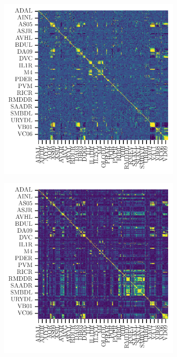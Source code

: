 \begin{figure}[h!]
	\centering
	\begin{subfigure}[b]{0.3\textwidth}
		\centering
		\includegraphics[width=\textwidth]{correlacion_super_critico.pdf}
		\caption{}
		\label{fig:correlacion_super_critico}
	\end{subfigure}
	\begin{subfigure}[b]{0.3\textwidth}
		\centering
		\includegraphics[width=\textwidth]{correlacion_critico.pdf}

\end{subfigure}
\end{figure}
